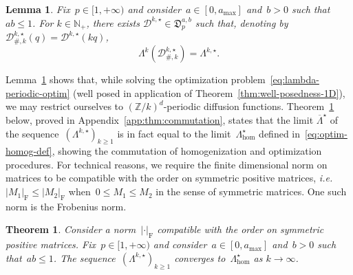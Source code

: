 \documentclass{article}
\newtheorem{theorem}{Theorem}
\newtheorem{lemma}{Lemma}
\renewcommand{\leq}{\leqslant}
\renewcommand{\geq}{\geqslant}
\def\N{\mathbb{N}}
\def\Z{\mathbb{Z}}
\newcommand{\Diff}{\mathcal{D}}
\newcommand{\Diffset}{\mathfrak{D}}
\newcommand{\F}{\mathrm{F}}
\newcommand{\normF}[1]{\left| #1 \right|_{\F}}
\renewcommand{\dim}{d}
\begin{document}
\begin{lemma}
  \label{lem:periodicity}
  Fix~$p \in [1,+\infty)$ and consider~$a \in [0,a_\mathrm{max}]$ and~$b > 0$ such that~$ab \leq 1$. For $k\in \N_+$, there exists $\Diff^{k,\star} \in \Diffset_{p}^{a,b}$ such that, denoting by~$\Diff_{\#,k}^{k,\star}(q) = \Diff^{k,\star}(kq)$, 
  \[
  \Lambda^k(\Diff_{\#,k}^{k,\star}) = \Lambda^{k,\star}.
  \]
\end{lemma}

Lemma~\ref{lem:periodicity} shows that, while solving the optimization problem~\eqref{eq:lambda-periodic-optim} (well posed in application of Theorem~\ref{thm:well-posedness-1D}), we may restrict ourselves to  $(\Z/k)^\dim$-periodic diffusion functions. Theorem~\ref{thm:commutation} below, proved in Appendix~\ref{app:thm:commutation}, states that the limit $\overline{\Lambda}^\star$ of the sequence~$(\Lambda^{k,\star})_{k \geq 1}$ is in fact equal to the limit~$\Lambda^\star_{\mathrm{hom}}$ defined in~\eqref{eq:optim-homog-def}, showing the commutation of homogenization and optimization procedures. For technical reasons, we require the finite dimensional norm on matrices to be compatible with the order on symmetric positive matrices, \emph{i.e.}~$\normF{M_1} \leq \normF{M_2}$ when~$0 \leq M_1 \leq M_2$ in the sense of symmetric matrices. One such norm is the Frobenius norm.

\begin{theorem}
  \label{thm:commutation}
  Consider a norm~$\normF{\cdot}$ compatible with the order on symmetric positive matrices.
  Fix~$p \in [1,+\infty)$ and consider~$a \in [0,a_\mathrm{max}]$ and~$b > 0$ such that~$ab \leq 1$.
    The sequence~$\left(\Lambda^{k,\star} \right)_{k\geq 1}$ converges to~$\Lambda^\star_{\mathrm{hom}}$ as $k\to \infty$.
\end{theorem}
\end{document}
